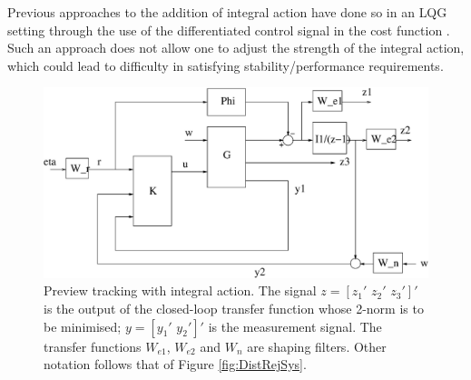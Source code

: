 \begin{description}
Previous approaches to the addition of integral action have done so in an \ac{LQG} setting through the use of the differentiated control signal in the cost function \citep[e.g. ][]{Tomizuka_1979_IntegralPreviewFI,Katayama_1987_PreviewAndIntegral,Tomi_1980_FFPrev}. Such an approach does not allow one to adjust the strength of the integral action, which could lead to difficulty in satisfying stability/performance requirements. 


\begin{figure}
\begin{center}
\stdcontrolfrags
{}
\includegraphics[width=12cm]{./diags/TrackSysInteg.eps}
\end{center}
\caption{Preview tracking with integral action. The signal $z=\left[z_1'\,\,z_2'\,\,z_3'\right]'$ is the output of the closed-loop transfer function
whose 2-norm is to be minimised; $y=\left[y_1'\,\,y_2'\right]'$ is the measurement signal. The transfer functions $W_{e1}$, $W_{e2}$ and $W_n$ are shaping filters. Other notation follows that of Figure \ref{fig:DistRejSys}. \label{fig:TrackSysIntegDesign}}
\end{figure}

\end{description}
 


 





